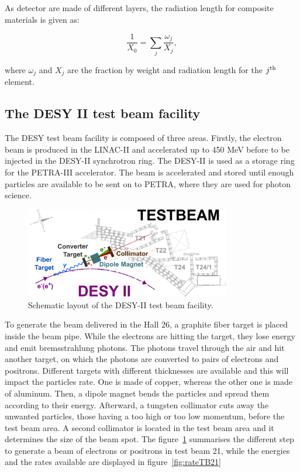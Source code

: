     As detector are made of different layers, the radiation length for composite materials is given as:

    \begin{equation}
      \frac{1}{X_{0}} = \sum_{j} \frac{\omega_{j}}{X_{j}},
    \end{equation}

   where $\omega_{j}$ and $X_{j}$ are the fraction by weight and radiation length for the $j^{\rm{th}}$ element.


    \subsection{The DESY II test beam facility}

    The \gls{DESY} test beam facility is composed of three areas.
    Firstly, the electron beam is produced in the LINAC-II and accelerated up to 450 MeV before to be injected in the DESY-II synchrotron ring.
    The DESY-II is used as a storage ring for the PETRA-III accelerator. 
    The beam is accelerated and stored until enough particles are available to be sent on to PETRA, where they are used for photon science.
    
    \begin{figure}[!h]
      \centering
      \includegraphics[width = 0.8\textwidth]{Pictures/X0/desy_tb-sketch.png}
      \caption{Schematic layout of the DESY-II test beam facility\cite{DESYII}.}
      \label{fig:desyTb-sketch}
    \end{figure}

    To generate the beam delivered in the Hall 26, a graphite fiber target is placed inside the beam pipe.
    While the electrons are hitting the target, they lose energy and emit bremsstrahlung photons.
    The photons travel through the air and hit another target, on which the photons are converted to pairs of electrons and positrons.
    Different targets with different thicknesses are available and this will impact the particles rate.
    One is made of copper, whereas the other one is made of aluminum.
    Then, a dipole magnet bends the particles and spread them according to their energy.
    Afterward, a tungsten collimator cuts away the unwanted particles, those having a too high or too low momentum, before the test beam area.
    A second collimator is located in the test beam area and it determines the size of the beam spot.
    The figure~\ref{fig:desyTb-sketch} summarises the different step to generate a beam of electrons or positrons in test beam 21, while the energies and the rates available are displayed in figure~\ref{fig:rateTB21}

